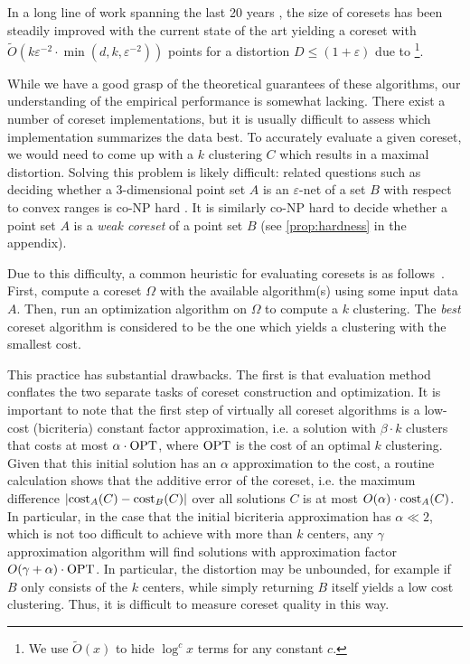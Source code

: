 In a long line of work spanning the last 20 years \cite{BecchettiBC0S19,BravermanJKW21,Chen09,Cohen-AddadSS21,FL11,FeldmanSS20,
HaM04,HaK07,huang2020coresets,BravermanJKW21,LS10,SohlerW18}, the size of coresets has been steadily improved with the current state of the art yielding a coreset with $\tilde{O}(k \varepsilon^{-2} \cdot \min(d,k,\varepsilon^{-2}))$ points for a distortion $D\leq (1+\varepsilon)$ due to \cite{CLSS22}\footnote{We use $\tilde O(x)$ to hide $\log^c x$ terms for any constant $c$.}.

While we have a good grasp of the theoretical guarantees of these algorithms, our understanding of the empirical performance is somewhat lacking. There exist a number of coreset implementations, but it is usually difficult to assess which implementation summarizes the data best. To accurately evaluate a given coreset, we would need to come up with a $k$ clustering $C$ which results in a maximal distortion. Solving this problem is likely difficult: related questions such as deciding whether a 3-dimensional point set $A$ is an $\varepsilon$-net of a set $B$ with respect to convex ranges is co-NP hard \cite{GiannopoulosKWW12}. It is similarly co-NP hard to decide whether a point set $A$ is a \emph{weak coreset} of a point set $B$ (see \cref{prop:hardness} in the appendix). 

Due to this difficulty, a common heuristic for evaluating coresets is as follows~\cite{AckermannMRSLS12,FGSSS13}. First, compute a coreset $\Omega$ with the available algorithm(s) using some input data $A$. Then, run an optimization algorithm on $\Omega$ to compute a $k$ clustering. The \emph{best} coreset algorithm is considered to be the one which yields a clustering with the smallest cost.

This practice has substantial drawbacks.
The first is that evaluation method conflates the two separate tasks of coreset construction and optimization.
It is important to note that the first step of virtually all coreset algorithms is a low-cost (bicriteria) constant factor approximation, i.e. a solution with $\beta\cdot k$ clusters that costs at most $\alpha\cdot \text{OPT}$, where $\text{OPT}$ is the cost of an optimal $k$ clustering.
Given that this initial solution has an $\alpha$ approximation to the cost, a routine calculation shows that the additive error of the coreset, i.e. the maximum difference
$ \left\vert \text{cost}_A(C) - \text{cost}_B(C) \right\vert $
over all solutions $C$ is at most $O(\alpha)\cdot \text{cost}_A(C)$. 
In particular, in the case that the initial bicriteria approximation has $\alpha \ll 2$, which is not too difficult to achieve with more than $k$ centers, any $\gamma$ approximation algorithm will find solutions with approximation factor $O(\gamma + \alpha) \cdot\text{OPT}$. In particular, the distortion may be unbounded, for example if $B$ only consists of the $k$ centers, while simply returning $B$ itself yields a low cost clustering. Thus, it is difficult to measure coreset quality in this way.

